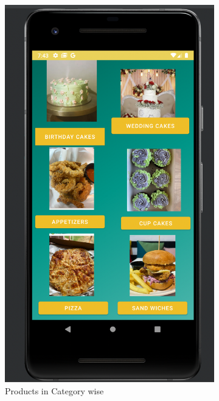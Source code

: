 \begin{figure}[H]
\begin{subfigure}[b]{0.3\textwidth}
         \includegraphics[width=\textwidth]{m2}
         \caption{Products in Category wise}
         \label{sec disp}
     \end{subfigure}
     \hfill
     \begin{subfigure}[b]{0.3\textwidth}
         \centering

\end{subfigure}
\end{figure}
